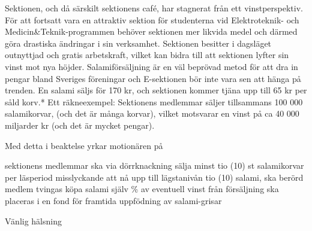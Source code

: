 \documentclass[../_main/handlingar.tex]{subfiles}
\begin{document}

Sektionen, och då särskilt sektionens café, har stagnerat från ett vinstperspektiv. För att fortsatt vara en attraktiv sektion för studenterna vid Elektroteknik- och Medicin\&Teknik-programmen behöver sektionen mer likvida medel och därmed göra drastiska ändringar i sin verksamhet. Sektionen besitter i dagsläget outnyttjad och gratis arbetskraft, vilket kan bidra till att sektionen lyfter sin vinst mot nya höjder. Salamiförsäljning är en väl beprövad metod för att dra in pengar bland Sveriges föreningar och E-sektionen bör inte vara sen att hänga på trenden. En salami säljs för 170 kr, och sektionen kommer tjäna upp till 65 kr per såld korv.* Ett räkneexempel: Sektionens medlemmar säljer tillsammans 100 000 salamikorvar, (och det är många korvar), vilket motsvarar en vinst på ca 40 000 miljarder kr (och det är mycket pengar).

Med detta i beaktelse yrkar motionären på
\begin{attsatser}
    \att sektionens medlemmar ska via dörrknackning sälja minst tio (10) st salamikorvar per läsperiod
    \att misslyckande att nå upp till lägstanivån tio (10) salami, ska berörd medlem tvingas köpa salami själv
    \% av eventuell vinst från försäljning ska placeras i en fond för framtida uppfödning av salami-grisar
\end{attsatser}

\begin{signatures}{1}
    Vänlig hälsning
    \signature{Tjorven ``Korven'' Svensson}{}
\end{signatures}
\end{document}

